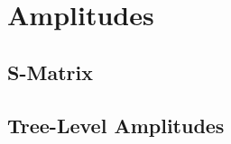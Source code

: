 \documentclass{report}
\theoremstyle{plain}
\theoremstyle{definition}
\theoremstyle{remark}
\begin{document}
\chapter{Amplitudes}

\section{S-Matrix}

\section{Tree-Level Amplitudes}
\end{document}
